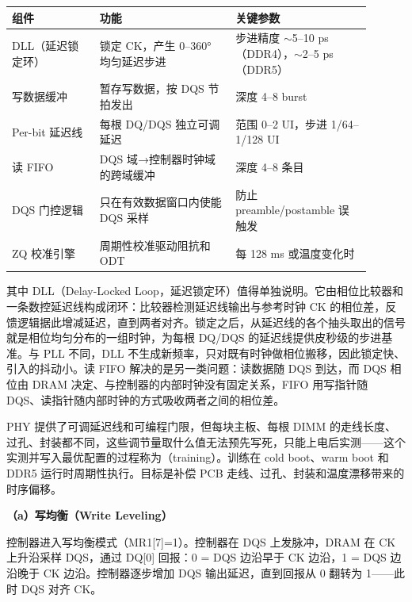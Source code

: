 \begin{longtable}{L{0.22\linewidth}L{0.34\linewidth}L{0.34\linewidth}}
\toprule
组件 & 功能 & 关键参数 \\
\midrule
DLL（延迟锁定环） & 锁定 CK，产生 0--360° 均匀延迟步进 & 步进精度 $\sim$5--10 ps（DDR4），$\sim$2--5 ps（DDR5） \\
写数据缓冲 & 暂存写数据，按 DQS 节拍发出 & 深度 4--8 burst \\
Per-bit 延迟线 & 每根 DQ/DQS 独立可调延迟 & 范围 0--2 UI，步进 1/64--1/128 UI \\
读 FIFO & DQS 域→控制器时钟域的跨域缓冲 & 深度 4--8 条目 \\
DQS 门控逻辑 & 只在有效数据窗口内使能 DQS 采样 & 防止 preamble/postamble 误触发 \\
ZQ 校准引擎 & 周期性校准驱动阻抗和 ODT & 每 128 ms 或温度变化时 \\
\bottomrule
\end{longtable}

其中 DLL（Delay-Locked Loop，延迟锁定环）值得单独说明。它由相位比较器和一条数控延迟线构成闭环：比较器检测延迟线输出与参考时钟 CK 的相位差，反馈逻辑据此增减延迟，直到两者对齐。锁定之后，从延迟线的各个抽头取出的信号就是相位均匀分布的一组时钟，为每根 DQ/DQS 的延迟线提供皮秒级的步进基准。与 PLL 不同，DLL 不生成新频率，只对既有时钟做相位搬移，因此锁定快、引入的抖动小。读 FIFO 解决的是另一类问题：读数据随 DQS 到达，而 DQS 相位由 DRAM 决定、与控制器的内部时钟没有固定关系，FIFO 用写指针随 DQS、读指针随内部时钟的方式吸收两者之间的相位差。


PHY 提供了可调延迟线和可编程门限，但每块主板、每根 DIMM 的走线长度、过孔、封装都不同，这些调节量取什么值无法预先写死，只能上电后实测——这个实测并写入最优配置的过程称为（training）。训练在 cold boot、warm boot 和 DDR5 运行时周期性执行。目标是补偿 PCB 走线、过孔、封装和温度漂移带来的时序偏移。

\textbf{（a）写均衡（Write Leveling）}

控制器进入写均衡模式（MR1[7]=1）。控制器在 DQS 上发脉冲，DRAM 在 CK 上升沿采样 DQS，通过 DQ[0] 回报：0 = DQS 边沿早于 CK 边沿，1 = DQS 边沿晚于 CK 边沿。控制器逐步增加 DQS 输出延迟，直到回报从 0 翻转为 1——此时 DQS 对齐 CK。

